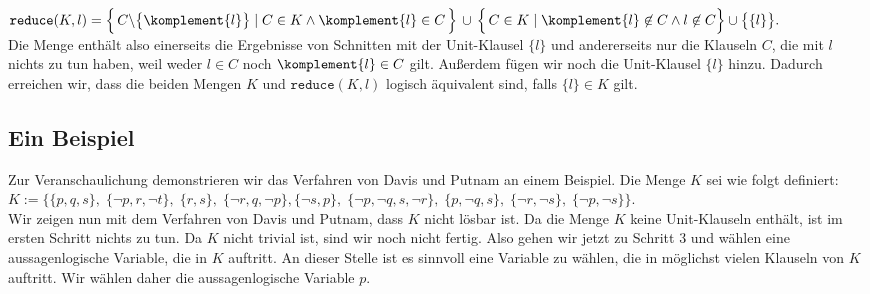 \hspace*{1.3cm}
$\texttt{reduce}(K,l)  = 
 \Bigl\{\, C \backslash \bigl\{\komplement{l}\bigr\} \;|\; C \in K \wedge \komplement{l} \in C \,\Bigr\} 
       \,\cup\, \Bigl\{\, C \in K \mid \komplement{l} \not\in C \wedge l \not\in C \Bigr\} \cup \bigl\{\{l\}\bigr\}.
$
\\[0.2cm]
Die Menge enthält also einerseits die Ergebnisse von Schnitten mit
der Unit-Klausel $\{l\}$ und andererseits nur die Klauseln $C$,
die mit $l$ nichts zu tun haben, weil weder $l \in C$ noch $\komplement{l} \in C$
gilt.  Außerdem fügen wir noch die Unit-Klausel $\{l\}$ hinzu.
Dadurch erreichen wir, dass die beiden Mengen $K$ und $\texttt{reduce}(K,l)$
logisch äquivalent sind, falls $\{l\} \in K$ gilt.

\subsection{Ein Beispiel}
Zur Veranschaulichung demonstrieren wir das Verfahren von Davis und Putnam an einem Beispiel.
Die Menge $K$ sei wie folgt definiert: \\[0.2cm]
\hspace*{-0.3cm}
 $K := \Big\{ \{p, q, s\},\; \{\neg p, r, \neg t\},\;  \{r, s\},\; \{\neg r, q, \neg p\}, 
               \{\neg s, p\},\; \{\neg p, \neg q, s, \neg r\},\; \{p, \neg q, s\},\; \{\neg r, \neg s\},\;
             \{\neg p, \neg s\} 
        \Big\}$. 
\\[0.2cm]
Wir zeigen nun mit dem Verfahren von Davis und Putnam, dass $K$ nicht lösbar ist.  Da die
Menge $K$ keine Unit-Klauseln enthält, ist im ersten Schritt nichts zu tun.  Da $K$ nicht
trivial ist, sind wir noch nicht fertig.  Also gehen wir jetzt zu Schritt 3 und wählen
eine aussagenlogische Variable, die in $K$ auftritt.  An dieser Stelle ist es sinnvoll
eine Variable zu wählen, die in möglichst vielen Klauseln von $K$ auftritt.  Wir wählen
daher die aussagenlogische Variable $p$.
